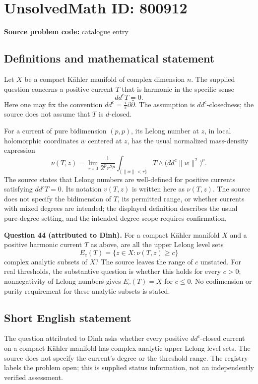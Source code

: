 \documentclass[11pt]{article}
\begin{document}
\section*{UnsolvedMath ID: 800912}
\textbf{Source problem code:} catalogue entry
\subsection{Definitions and mathematical statement}
Let \(X\) be a compact K\"ahler manifold of complex dimension \(n\). The supplied question concerns a positive current \(T\) that is harmonic in the specific sense
\[
 dd^cT=0.
\]
Here one may fix the convention \(dd^c=\frac{i}{\pi}\partial\bar\partial\). The assumption is \(dd^c\)-closedness; the source does not assume that \(T\) is \(d\)-closed.

For a current of pure bidimension \((p,p)\), its Lelong number at \(z\), in local holomorphic coordinates \(w\) centered at \(z\), has the usual normalized mass-density expression
\[
 \nu(T,z)=\lim_{r\downarrow0}\frac{1}{2^p r^{2p}}
 \int_{\{\lVert w\rVert<r\}}T\wedge\bigl(dd^c\lVert w\rVert^2\bigr)^p.
\]
The source states that Lelong numbers are well-defined for positive currents satisfying \(dd^cT=0\). Its notation \(v(T,z)\) is written here as \(\nu(T,z)\). The source does not specify the bidimension of \(T\), its permitted range, or whether currents with mixed degrees are intended; the displayed definition describes the usual pure-degree setting, and the intended degree scope requires confirmation.

\textbf{Question 44 (attributed to Dinh).} For a compact K\"ahler manifold \(X\) and a positive harmonic current \(T\) as above, are all the upper Lelong level sets
\[
 E_c(T)=\{z\in X:\nu(T,z)\geq c\}
\]
complex analytic subsets of \(X\)? The source leaves the range of \(c\) unstated. For real thresholds, the substantive question is whether this holds for every \(c>0\); nonnegativity of Lelong numbers gives \(E_c(T)=X\) for \(c\leq0\). No codimension or purity requirement for these analytic subsets is stated.
\subsection{Short English statement}
The question attributed to Dinh asks whether every positive \(dd^c\)-closed current on a compact K\"ahler manifold has complex analytic upper Lelong level sets. The source does not specify the current's degree or the threshold range. The registry labels the problem open; this is supplied status information, not an independently verified assessment.
\end{document}
